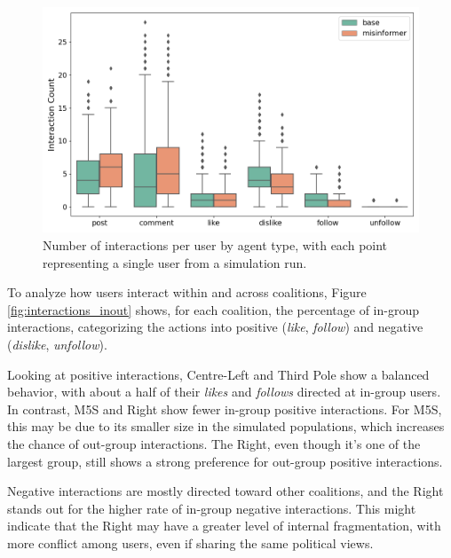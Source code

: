 \begin{figure}[h]
    \centering
    \includegraphics[width=1\linewidth]{Images/Interactions/count_per_user_DefaultRecSys.png}
    \caption{Number of interactions per user by agent type, with each point representing a single user from a simulation run.}
    \label{fig:interactions_count}
\end{figure}

\medskip
To analyze how users interact within and across coalitions, Figure \ref{fig:interactions_inout} shows, for each coalition, the percentage of in-group interactions, categorizing the actions into positive (\textit{like}, \textit{follow}) and negative (\textit{dislike}, \textit{unfollow}).

Looking at positive interactions, Centre-Left and Third Pole show a balanced behavior, with about a half of their \textit{likes} and \textit{follows} directed at in-group users.
In contrast, M5S and Right show fewer in-group positive interactions. 
For M5S, this may be due to its smaller size in the simulated populations, which increases the chance of out-group interactions.
The Right, even though it's one of the largest group, still shows a strong preference for out-group positive interactions.

Negative interactions are mostly directed toward other coalitions, and the Right stands out for the higher rate of in-group negative interactions.
This might indicate that the Right may have a greater level of internal fragmentation, with more conflict among users, even if sharing the same political views.

